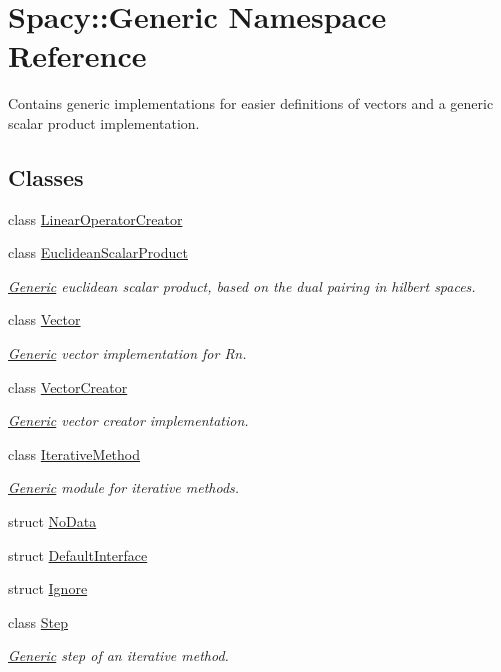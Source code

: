 \hypertarget{namespaceSpacy_1_1Generic}{\section{\-Spacy\-:\-:\-Generic \-Namespace \-Reference}
\label{namespaceSpacy_1_1Generic}
}


\-Contains generic implementations for easier definitions of vectors and a generic scalar product implementation.  


\subsection*{\-Classes}
\begin{DoxyCompactItemize}
\item 
class \hyperlink{classSpacy_1_1Generic_1_1LinearOperatorCreator}{\-Linear\-Operator\-Creator}
\item 
class \hyperlink{classSpacy_1_1Generic_1_1EuclideanScalarProduct}{\-Euclidean\-Scalar\-Product}
\begin{DoxyCompactList}\small\item\em \hyperlink{namespaceSpacy_1_1Generic}{\-Generic} euclidean scalar product, based on the dual pairing in hilbert spaces. \end{DoxyCompactList}\item 
class \hyperlink{classSpacy_1_1Generic_1_1Vector}{\-Vector}
\begin{DoxyCompactList}\small\item\em \hyperlink{namespaceSpacy_1_1Generic}{\-Generic} vector implementation for \-Rn. \end{DoxyCompactList}\item 
class \hyperlink{classSpacy_1_1Generic_1_1VectorCreator}{\-Vector\-Creator}
\begin{DoxyCompactList}\small\item\em \hyperlink{namespaceSpacy_1_1Generic}{\-Generic} vector creator implementation. \end{DoxyCompactList}\item 
class \hyperlink{classSpacy_1_1Generic_1_1IterativeMethod}{\-Iterative\-Method}
\begin{DoxyCompactList}\small\item\em \hyperlink{namespaceSpacy_1_1Generic}{\-Generic} module for iterative methods. \end{DoxyCompactList}\item 
struct \hyperlink{structSpacy_1_1Generic_1_1NoData}{\-No\-Data}
\item 
struct \hyperlink{structSpacy_1_1Generic_1_1DefaultInterface}{\-Default\-Interface}
\item 
struct \hyperlink{structSpacy_1_1Generic_1_1Ignore}{\-Ignore}
\item 
class \hyperlink{classSpacy_1_1Generic_1_1Step}{\-Step}
\begin{DoxyCompactList}\small\item\em \hyperlink{namespaceSpacy_1_1Generic}{\-Generic} step of an iterative method. \end{DoxyCompactList}\end{DoxyCompactItemize}
